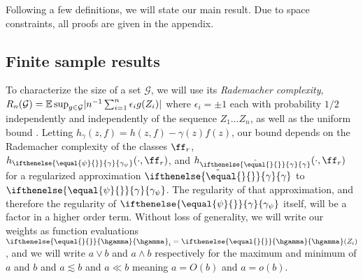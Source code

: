 \documentclass[aos,submission]{imsart}
\theoremstyle{plain}
\theoremstyle{remark}
\newcommand{\riesz}[1][]{\ifthenelse{\equal{#1}{}}{\gamma}{\gamma_{{#1}}}}
\newcommand{\hriesz}[1][]{\ifthenelse{\equal{#1}{}}{\hgamma}{\hgamma_{{#1}}}}
\DeclarePairedDelimiter\abs{\lvert}{\rvert}
\DeclarePairedDelimiter\norm{\lVert}{\rVert}
\newcommand{\GG}{\mathcal{G}}
\begin{document}
Following a few definitions, we will state our main result.
Due to space constraints, all proofs are given in the appendix.

\subsection{Finite sample results}
\label{sec:main-results}
To characterize the size of a set $\GG$, we will use its \emph{Rademacher complexity}, $R_n(\GG) = \E \sup_{g \in \GG}\abs{n^{-1}\sum_{i=1}^n \epsilon_i g(Z_i)}$ where $\epsilon_i = \pm 1$ each with probability $1/2$
independently and independently of the sequence $Z_1 \ldots Z_n$, as well as the uniform bound \smash{$M_{\infty}(\GG)$} \smash{$= \sup_{g \in \GG} \norm{g}_{\infty}$}.
Letting $h_{\gamma}(z,f)=h(z,f)-\gamma(z)f(z)$, our bound depends
on the Rademacher complexity of the classes $\ff_r$,
$h_{\riesz[\psi]}(\cdot,\ff_r)$, and $h_{\tilde \riesz}(\cdot,\ff_r)$ 
for a regularized approximation $\tilde\riesz$ to $\riesz[\psi]$. The regularity of that approximation, 
and therefore the regularity of $\riesz[\psi]$ itself, will be a factor in a higher order term.
Without loss of generality, we will write our weights as function evaluations $\hriesz_i=\hriesz(Z_i)$,
and we will write $a \vee b$ and $a \wedge b$ respectively for the maximum and minimum of $a$ and $b$
and $a \lesssim b$ and $a \ll b$ meaning $a = O(b)$ and $a = o(b)$.
\end{document}
